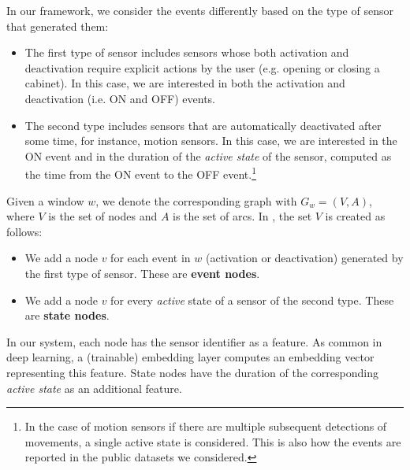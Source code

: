 In our framework, we consider the events differently based on the type of sensor that generated them:
\begin{itemize}
    \item The first type of sensor includes sensors whose both activation and deactivation require explicit actions by the user (e.g. opening or closing a cabinet). In this case, we are interested in both the activation and deactivation (i.e. ON and OFF) events.
    \item The second type includes sensors that are automatically deactivated after some time, for instance, motion sensors. In this case, we are interested in the ON event and in the duration of the \textit{active state} of the sensor, computed as the time from the ON event to the OFF event.\footnote{In the case of motion sensors if there are multiple subsequent detections of movements, a single active state is considered. This is also how the events are reported in the public datasets we considered.}
\end{itemize}

Given a window $w$, we denote the corresponding graph with $G_w = (V,A)$, where $V$ is the set of nodes and $A$ is the set of arcs. In \acronym{}, the set $V$ is created as follows:

\begin{itemize}
    \item We add a node $v$ for each event in $w$ (activation or deactivation) generated by the first type of sensor. These are \textbf{event nodes}.
    \item We add a node $v$ for every \textit{active} state of a sensor of the second type. These are \textbf{state nodes}.
\end{itemize}
In our system, each node has the sensor identifier as a feature. As common in deep learning, a (trainable) embedding layer computes an embedding vector representing this feature. State nodes have the duration of the corresponding \textit{active state} as an additional feature.

